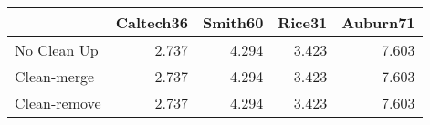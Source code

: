 \begin{tabular}{lrrrr}
\toprule
{} & Caltech36 & Smith60 & Rice31 & Auburn71 \\
\midrule
No Clean Up  &     2.737 &   4.294 &  3.423 &    7.603 \\
Clean-merge  &     2.737 &   4.294 &  3.423 &    7.603 \\
Clean-remove &     2.737 &   4.294 &  3.423 &    7.603 \\
\bottomrule
\end{tabular}
